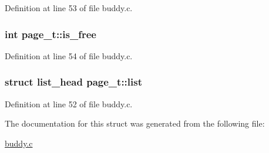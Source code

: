 Definition at line 53 of file buddy.\+c.

\subsubsection[{\texorpdfstring{is\+\_\+free}{is_free}}]{\setlength{\rightskip}{0pt plus 5cm}int page\+\_\+t\+::is\+\_\+free}\hypertarget{structpage__t_a0f152e52d0a751f6c17df9279b89714d}{}\label{structpage__t_a0f152e52d0a751f6c17df9279b89714d}


Definition at line 54 of file buddy.\+c.

\subsubsection[{\texorpdfstring{list}{list}}]{\setlength{\rightskip}{0pt plus 5cm}struct {\bf list\+\_\+head} page\+\_\+t\+::list}\hypertarget{structpage__t_a97306c6fff4f6280e8e8049412091475}{}\label{structpage__t_a97306c6fff4f6280e8e8049412091475}


Definition at line 52 of file buddy.\+c.



The documentation for this struct was generated from the following file\+:\begin{DoxyCompactItemize}
\item 
\hyperlink{buddy_8c}{buddy.\+c}\end{DoxyCompactItemize}
